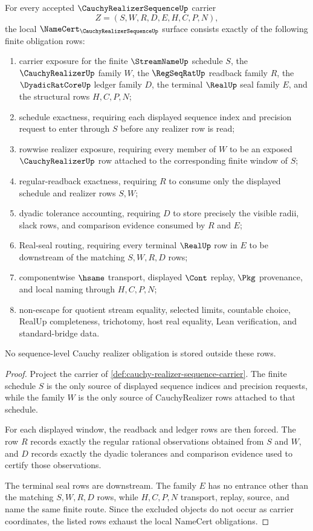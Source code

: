 \begin{theorem}
\label{thm:cauchy-realizer-sequence-namecert-obligations}
For every accepted $\CauchyRealizerSequenceUp$ carrier
$$
Z=(S,W,R,D,E,H,C,P,N),
$$
the local $\NameCert_{\CauchyRealizerSequenceUp}$ surface consists exactly of the following finite obligation rows:
\begin{enumerate}
\item carrier exposure for the finite $\StreamNameUp$ schedule $S$, the $\CauchyRealizerUp$ family $W$, the $\RegSeqRatUp$ readback family $R$, the $\DyadicRatCoreUp$ ledger family $D$, the terminal $\RealUp$ seal family $E$, and the structural rows $H,C,P,N$;
\item schedule exactness, requiring each displayed sequence index and precision request to enter through $S$ before any realizer row is read;
\item rowwise realizer exposure, requiring every member of $W$ to be an exposed $\CauchyRealizerUp$ row attached to the corresponding finite window of $S$;
\item regular-readback exactness, requiring $R$ to consume only the displayed schedule and realizer rows $S,W$;
\item dyadic tolerance accounting, requiring $D$ to store precisely the visible radii, slack rows, and comparison evidence consumed by $R$ and $E$;
\item Real-seal routing, requiring every terminal $\RealUp$ row in $E$ to be downstream of the matching $S,W,R,D$ rows;
\item componentwise $\hsame$ transport, displayed $\Cont$ replay, $\Pkg$ provenance, and local naming through $H,C,P,N$;
\item non-escape for quotient stream equality, selected limits, countable choice, RealUp completeness, trichotomy, host real equality, Lean verification, and standard-bridge data.
\end{enumerate}
No sequence-level Cauchy realizer obligation is stored outside these rows.
\end{theorem}
\begin{proof}
Project the carrier of \autoref{def:cauchy-realizer-sequence-carrier}. The finite schedule $S$ is the only source of displayed sequence indices and precision requests, while the family $W$ is the only source of CauchyRealizer rows attached to that schedule.

For each displayed window, the readback and ledger rows are then forced. The row $R$ records exactly the regular rational observations obtained from $S$ and $W$, and $D$ records exactly the dyadic tolerances and comparison evidence used to certify those observations.

The terminal seal rows are downstream. The family $E$ has no entrance other than the matching $S,W,R,D$ rows, while $H,C,P,N$ transport, replay, source, and name the same finite route. Since the excluded objects do not occur as carrier coordinates, the listed rows exhaust the local NameCert obligations.
\end{proof}

